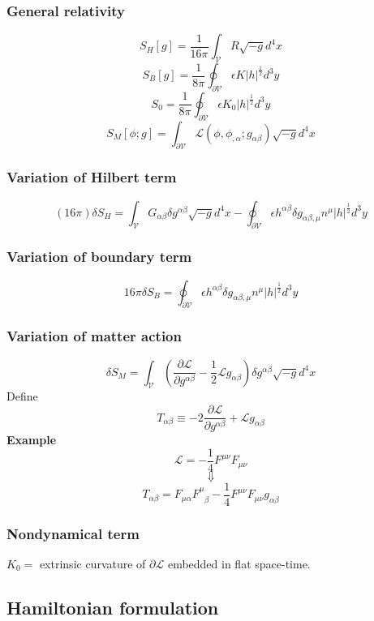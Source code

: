 \documentclass{article}
\begin{document}
\subsubsection{General relativity}
\[S_{H}[g] = \frac{1}{16\pi} \int_{\mathcal{V}} R \sqrt{-g} d^4 x\]
\[S_{B}[g] = \frac{1}{8 \pi} \oint_{\partial \mathcal{V}} \epsilon K |h|^{\frac{1}{2}} d^3 y\]
\[S_0 = \frac{1}{8\pi} \oint_{\partial \mathcal{V}} \epsilon K_0 |h|^{\frac{1}{2}} d^3 y\]
\[S_M[\phi;g] = \int_{\partial \mathcal{V}} \mathcal{L}(\phi,\phi_{,\alpha};g_{\alpha \beta}) \sqrt{-g} d^4 x\]

\subsubsection{Variation of Hilbert term}
\[(16 \pi) \delta S_H = \int_{\mathcal{V}} G_{\alpha \beta} \delta g^{\alpha \beta} \sqrt{-g} d^4 x - \oint_{\partial \mathcal{V}} \epsilon h^{\alpha \beta} \delta g_{\alpha \beta, \mu} n^{\mu} |h|^{\frac{1}{2}} d^3 y\]

\subsubsection{Variation of boundary term}
\[16\pi \delta S_B = \oint_{\partial \mathcal{V}} \epsilon h^{\alpha \beta} \delta g_{\alpha \beta, \mu} n^{\mu} |h|^{\frac{1}{2}} d^3 y \]

\subsubsection{Variation of matter action}
\[\delta S_M = \int_{\mathcal{V}} \left( \frac{\partial \mathcal{L}}{\partial g^{\alpha \beta}} - \frac{1}{2} \mathcal{L} g_{\alpha \beta} \right) \delta g^{\alpha \beta} \sqrt{-g} d^4 x\]
Define
\[T_{\alpha \beta} \equiv -2 \frac{\partial \mathcal{L}}{\partial g^{\alpha \beta}} + \mathcal{L} g_{\alpha \beta}\]
\textbf{Example}
\[\mathcal{L} = -\frac{1}{4} F^{\mu \nu}F_{\mu \nu}\]
\[\Downarrow\]
\[T_{\alpha \beta} = F_{\mu \alpha} F^{\mu}_{\phantom{\mu} \beta} - \frac{1}{4} F^{\mu \nu} F_{\mu \nu} g_{\alpha \beta}\]

\subsubsection{Nondynamical term}
$K_0 = $ extrinsic curvature of $\partial \mathcal{L}$ embedded in flat space-time.

\subsection{Hamiltonian formulation}
\end{document}
